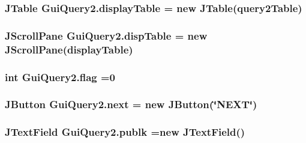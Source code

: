 \subsubsection[{\texorpdfstring{display\+Table}{displayTable}}]{\setlength{\rightskip}{0pt plus 5cm}J\+Table Gui\+Query2.\+display\+Table = new J\+Table({\bf query2\+Table})\hspace{0.3cm}{\ttfamily [private]}}\hypertarget{classGuiQuery2_af15c62d5c9199ea2fdf2de7442495c72}{}\label{classGuiQuery2_af15c62d5c9199ea2fdf2de7442495c72}
\subsubsection[{\texorpdfstring{disp\+Table}{dispTable}}]{\setlength{\rightskip}{0pt plus 5cm}J\+Scroll\+Pane Gui\+Query2.\+disp\+Table = new J\+Scroll\+Pane({\bf display\+Table})\hspace{0.3cm}{\ttfamily [private]}}\hypertarget{classGuiQuery2_abba8f10b666db3ea7653c3f6a647fb60}{}\label{classGuiQuery2_abba8f10b666db3ea7653c3f6a647fb60}
\subsubsection[{\texorpdfstring{flag}{flag}}]{\setlength{\rightskip}{0pt plus 5cm}int Gui\+Query2.\+flag =0\hspace{0.3cm}{\ttfamily [private]}}\hypertarget{classGuiQuery2_ac581df0639712a0ef23b6eee49df03e0}{}\label{classGuiQuery2_ac581df0639712a0ef23b6eee49df03e0}
\subsubsection[{\texorpdfstring{next}{next}}]{\setlength{\rightskip}{0pt plus 5cm}J\+Button Gui\+Query2.\+next = new J\+Button(\char`\"{}N\+E\+XT\char`\"{})\hspace{0.3cm}{\ttfamily [private]}}\hypertarget{classGuiQuery2_a2a63533eaacb408e66da8beb1738b140}{}\label{classGuiQuery2_a2a63533eaacb408e66da8beb1738b140}
\subsubsection[{\texorpdfstring{publk}{publk}}]{\setlength{\rightskip}{0pt plus 5cm}J\+Text\+Field Gui\+Query2.\+publk =new J\+Text\+Field()\hspace{0.3cm}{\ttfamily [private]}}\hypertarget{classGuiQuery2_aadf0bcfdb4aa2bad406378cf07be0c24}{}\label{classGuiQuery2_aadf0bcfdb4aa2bad406378cf07be0c24}
